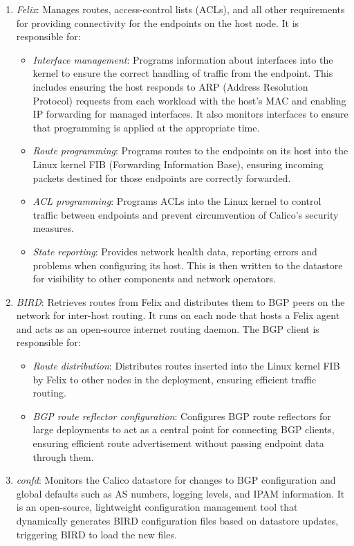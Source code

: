 \begin{enumerate}
  \itemsep0em
  \item \textit{Felix}: Manages routes, access-control lists (ACLs), and all
    other requirements for providing connectivity for the endpoints on the host
    node. It is responsible for:
    \begin{itemize}
      \itemsep0em
      \item \textit{Interface management}: Programs information about interfaces
        into the kernel to ensure the correct handling of traffic from the
        endpoint. This includes ensuring the host responds to ARP (Address
        Resolution Protocol) requests from each workload with the host's MAC and
        enabling IP forwarding for managed interfaces.
        It also monitors interfaces to ensure that programming is applied at the
        appropriate time.
      \item \textit{Route programming}: Programs routes to the endpoints on its
        host into the Linux kernel FIB (Forwarding Information Base), ensuring
        incoming packets destined for those endpoints are correctly forwarded.
      \item \textit{ACL programming}: Programs ACLs into the Linux kernel to
        control traffic between endpoints and prevent circumvention of Calico's
        security measures.
      \item \textit{State reporting}: Provides network health data, reporting
        errors and problems when configuring its host. This is then written to
        the datastore for visibility to other components and network operators.
    \end{itemize}
  \item \textit{BIRD}: Retrieves routes from Felix and distributes them to BGP
    peers on the network for inter-host routing. It runs on each node that hosts
    a Felix agent and acts as an open-source internet routing daemon. The BGP
    client is responsible for:
    \begin{itemize}
      \itemsep0em
      \item \textit{Route distribution}: Distributes routes inserted into the
        Linux kernel FIB by Felix to other nodes in the deployment, ensuring
        efficient traffic routing.
      \item \textit{BGP route reflector configuration}: Configures BGP route
        reflectors for large deployments to act as a central point for
        connecting BGP clients, ensuring efficient route advertisement without
        passing endpoint data through them.
    \end{itemize}
  \item \textit{confd}: Monitors the Calico datastore for changes to BGP
    configuration and global defaults such as AS numbers, logging levels, and
    IPAM information. It is an open-source, lightweight configuration
    management tool that dynamically generates BIRD configuration files based on
    datastore updates, triggering BIRD to load the new files.
\end{enumerate}


